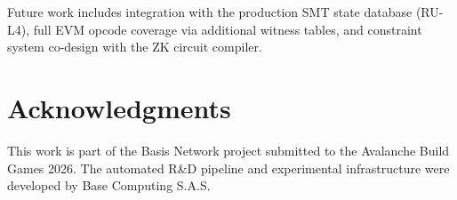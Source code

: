 \documentclass[conference]{IEEEtran}
\begin{document}
Future work includes integration with the production SMT state
database (RU-L4), full EVM opcode coverage via additional witness
tables, and constraint system co-design with the ZK circuit
compiler.

\section*{Acknowledgments}

This work is part of the Basis Network project submitted to the
Avalanche Build Games 2026. The automated R\&D pipeline and
experimental infrastructure were developed by Base Computing S.A.S.

\balance


\end{document}
